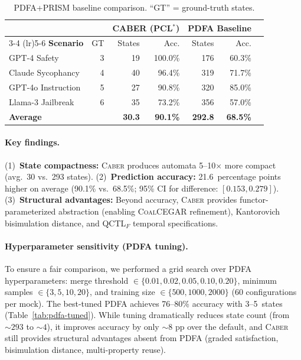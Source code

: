 \documentclass[11pt]{article}
\newcommand{\tool}{\textsc{Caber}}
\newcommand{\coalcegar}{\textsc{CoalCEGAR}}
\newcommand{\qctlf}{QCTL$_F$}
\begin{document}
\begin{table}[t]
\centering
\caption{PDFA+PRISM baseline comparison.  ``GT'' = ground-truth states.}
\label{tab:baseline}
\small
\begin{tabular}{@{}lrrrrrr@{}}
\toprule
& & \multicolumn{2}{c}{\textbf{CABER (PCL$^*$)}} & \multicolumn{2}{c}{\textbf{PDFA Baseline}} \\
\cmidrule(lr){3-4} \cmidrule(lr){5-6}
\textbf{Scenario} & GT & States & Acc. & States & Acc. \\
\midrule
GPT-4 Safety     & 3 & 19 & 100.0\% & 176 & 60.3\% \\
Claude Sycophancy & 4 & 40 & 96.4\% & 319 & 71.7\% \\
GPT-4o Instruction & 5 & 27 & 90.8\% & 320 & 85.0\% \\
Llama-3 Jailbreak & 6 & 35 & 73.2\% & 356 & 57.0\% \\
\midrule
\textbf{Average}  &   & \textbf{30.3} & \textbf{90.1\%} & \textbf{292.8} & \textbf{68.5\%} \\
\bottomrule
\end{tabular}
\end{table}

\paragraph{Key findings.}
(1)~\textbf{State compactness:} \tool{} produces automata 5--10$\times$
more compact (avg.\ 30 vs.\ 293 states).
(2)~\textbf{Prediction accuracy:} 21.6~percentage points higher on
average (90.1\% vs.\ 68.5\%; 95\% CI for difference:
$[0.153, 0.279]$).
(3)~\textbf{Structural advantages:} Beyond accuracy, \tool{} provides
functor-parameterized abstraction (enabling \coalcegar{} refinement),
Kantorovich bisimulation distance, and \qctlf{} temporal specifications.

\paragraph{Hyperparameter sensitivity (PDFA tuning).}
To ensure a fair comparison, we performed a grid search over PDFA
hyperparameters: merge threshold $\in \{0.01, 0.02, 0.05, 0.10, 0.20\}$,
minimum samples $\in \{3, 5, 10, 20\}$, and training size
$\in \{500, 1000, 2000\}$ (60 configurations per mock).
The best-tuned PDFA achieves 76--80\% accuracy with 3--5~states
(Table~\ref{tab:pdfa-tuned}).  While tuning dramatically reduces state
count (from ${\sim}293$ to ${\sim}4$), it improves accuracy by only
${\sim}8$ pp over the default, and \tool{} still provides structural
advantages absent from PDFA (graded satisfaction, bisimulation distance,
multi-property reuse).
\end{document}
